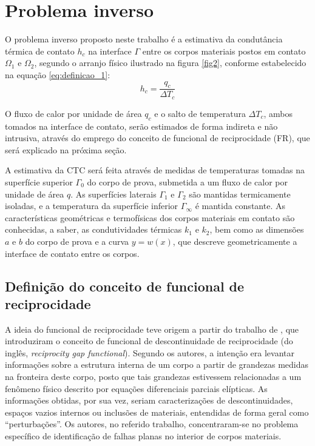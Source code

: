 \section{Problema inverso}\label{sec_prob_inv}

O problema inverso proposto neste trabalho é a estimativa da condutância térmica de contato $h_c$ na interface $\Gamma$ entre os corpos materiais
postos em contato $\Omega_1$ e $\Omega_2$, segundo o arranjo físico ilustrado na figura \ref{fig2}, conforme estabelecido na equação \eqref{eq:definicao_1}:
\begin{equation}
	h_c = \frac{q_c}{\Delta T_c}
\end{equation}

O fluxo de calor por unidade de área $q_c$ e o salto de temperatura $\Delta T_c$, ambos tomados na interface de contato, serão estimados de forma
indireta e não intrusiva, através do emprego do conceito de funcional de reciprocidade (FR), que será explicado na próxima seção.

A estimativa da CTC será feita através de medidas de temperaturas tomadas na superfície superior $\Gamma_0$ do corpo de prova, submetida a um fluxo
de calor por unidade de área $q$. As superfícies laterais $\Gamma_1$ e $\Gamma_2$ são mantidas termicamente isoladas, e a temperatura da superfície
inferior $\Gamma_\infty$ é mantida constante. As características geométricas e termofísicas dos corpos materiais em contato são conhecidas, a saber, as 
condutividades térmicas $k_1$ e $k_2$, bem como as dimensões $a$ e $b$ do corpo de prova e a curva $y = w(x)$, que descreve geometricamente a interface
de contato entre os corpos. 

\subsection{Definição do conceito de funcional de reciprocidade}

A ideia do funcional de reciprocidade teve origem a partir do trabalho de \cite{artigo_andrieux}, que introduziram o conceito de funcional de descontinuidade
de reciprocidade (do inglês, \textit{reciprocity gap functional}). Segundo os autores, a intenção era levantar informações sobre a estrutura interna de
um corpo a partir de grandezas medidas na fronteira deste corpo, posto que tais grandezas estivessem relacionadas a um fenômeno físico descrito por
equações diferenciais parciais elípticas. As informações obtidas, por sua vez, seriam caracterizações de descontinuidades, espaços vazios internos ou inclusões
de materiais, entendidas de forma geral como ``perturbações''. Os autores, no referido trabalho, concentraram-se no problema específico de identificação
de falhas planas no interior de corpos materiais.

